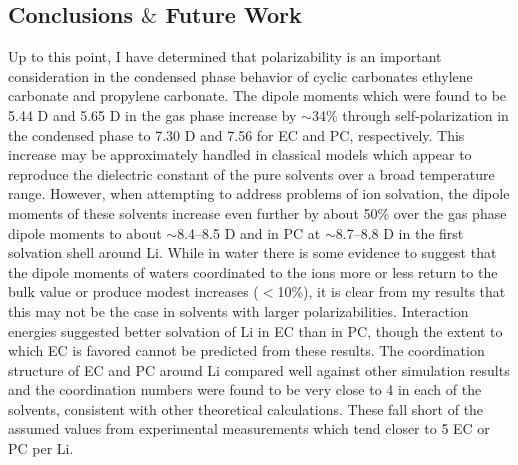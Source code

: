 \begin{ecpc}
  \section{\label{ch4:sec4:level1}Conclusions $\&$ Future Work}
   Up to this point, I have determined that polarizability is an important consideration in the condensed phase behavior of cyclic carbonates ethylene carbonate and propylene carbonate.
   The dipole moments which were found to be 5.44 D and 5.65 D in the gas phase increase by $\sim$34\% through self-polarization in the condensed phase to 7.30 D and 7.56 for EC and PC,
   respectively. This increase may be approximately handled in classical models which appear to reproduce the dielectric constant of the pure solvents over a broad temperature range\cite{you2015dielectric}.
   However, when attempting to address problems of ion solvation, the dipole moments of these solvents increase even further by about 50\% over the gas phase dipole moments to about
   $\sim$8.4--8.5 D and in PC at $\sim$8.7--8.8 D in the first solvation shell around Li\sur{+}. While in water there is some evidence to suggest that the dipole moments of waters
   coordinated to the ions more or less return to the bulk value or produce modest increases ($<$10\%)\cite{heuft2003cl,heuft2005f,heuft2005i,krekeler2006density,lightstone2001first}, it is clear from my results that this may not be the case 
   in solvents with larger polarizabilities. Interaction energies suggested better solvation of Li\sur{+} in EC than in PC, though the extent to which EC is favored cannot be predicted
   from these results. The coordination structure of EC and PC around Li\sur{+} compared well against other simulation results and the coordination numbers were found to be very close 
   to 4 in each of the solvents, consistent with other theoretical calculations. These fall short of the assumed values from experimental measurements which tend closer to 5 EC or PC
   per Li\sur{+}.
   

\end{ecpc}
